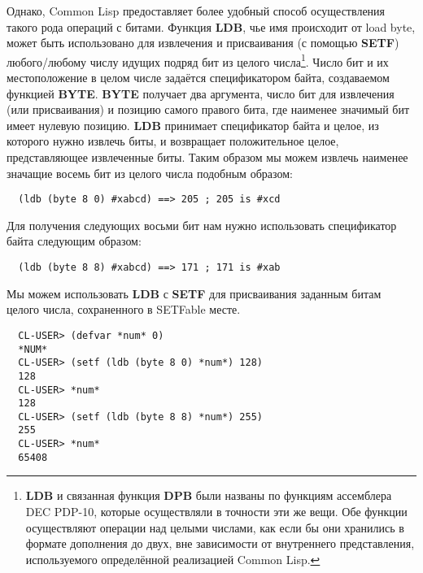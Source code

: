 Однако, Common Lisp предоставляет более удобный способ осуществления такого рода операций
с битами. Функция \textbf{LDB}, чье имя происходит от load byte, может быть использовано
для извлечения и присваивания (с помощью \textbf{SETF}) любого/любому числу идущих подряд
бит из целого числа\footnote{\textbf{LDB} и связанная функция \textbf{DPB} были названы по
  функциям ассемблера DEC PDP-10, которые осуществляли в точности эти же вещи. Обе функции
  осуществляют операции над целыми числами, как если бы они хранились в формате дополнения
  до двух, вне зависимости от внутреннего представления, используемого определённой
  реализацией Common Lisp.}. Число бит и их местоположение в целом числе задаётся
спецификатором байта, создаваемом функцией \textbf{BYTE}. \textbf{BYTE} получает два
аргумента, число бит для извлечения (или присваивания) и позицию самого правого бита, где
наименее значимый бит имеет нулевую позицию. \textbf{LDB} принимает спецификатор байта и
целое, из которого нужно извлечь биты, и возвращает положительное целое, представляющее
извлеченные биты. Таким образом мы можем извлечь наименее значащие восемь бит из целого
числа подобным образом:

\begin{lstlisting}
  (ldb (byte 8 0) #xabcd) ==> 205 ; 205 is #xcd
\end{lstlisting}

Для получения следующих восьми бит нам нужно использовать спецификатор байта  следующим образом:

\begin{lstlisting}
  (ldb (byte 8 8) #xabcd) ==> 171 ; 171 is #xab
\end{lstlisting}

Мы можем использовать \textbf{LDB} с \textbf{SETF} для присваивания заданным битам целого
числа, сохраненного в SETFable месте.

\begin{verbatim}
  CL-USER> (defvar *num* 0)
  *NUM*
  CL-USER> (setf (ldb (byte 8 0) *num*) 128)
  128
  CL-USER> *num*
  128
  CL-USER> (setf (ldb (byte 8 8) *num*) 255)
  255
  CL-USER> *num*
  65408
\end{verbatim}

